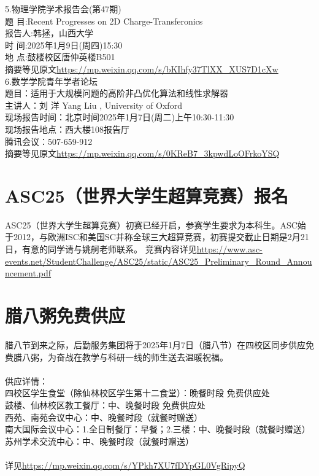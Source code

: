 \documentclass[letterpaper, 12pt]{article}
\begin{document}
\begin{multicols}{2}
5.物理学院学术报告会(第47期)\\
题 目:Recent Progresses on 2D Charge-Transferonics\\
报告人:韩拯，山西大学\\
时 间:2025年1月9日(周四)15:30\\
地 点:鼓楼校区唐仲英楼B501\\
摘要等见原文\url{https://mp.weixin.qq.com/s/bKIhfy37TlXX_XUS7D1cXw}\\

6.数学学院青年学者论坛\\
题目：适用于大规模问题的高阶非凸优化算法和线性求解器\\
主讲人：刘 洋 Yang Liu , University of Oxford\\
现场报告时间：北京时间2025年1月7日(周二)上午10:30-11:30\\
现场报告地点：西大楼108报告厅\\
腾讯会议：507-659-912\\
摘要等见原文\url{https://mp.weixin.qq.com/s/0KReB7_3kpwdLoOFrkoYSQ}\\


\section{ASC25（世界大学生超算竞赛）报名}
ASC25（世界大学生超算竞赛）初赛已经开启，参赛学生要求为本科生。ASC始于2012，与欧洲ISC和美国SC并称全球三大超算竞赛，初赛提交截止日期是2月21日，有意的同学请与姚舸老师联系。
竞赛内容详见\url{https://www.asc-events.net/StudentChallenge/ASC25/static/ASC25_Preliminary_Round_Announcement.pdf}


\section{腊八粥免费供应}
腊八节到来之际，后勤服务集团将于2025年1月7日（腊八节）在四校区同步供应免费腊八粥，为奋战在教学与科研一线的师生送去温暖祝福。\\\\
供应详情：\\
四校区学生食堂（除仙林校区学生第十二食堂）：晚餐时段  免费供应处 \\
鼓楼、仙林校区教工餐厅：中、晚餐时段  免费供应处\\
西苑、南苑会议中心：中、晚餐时段（就餐时赠送）\\
南大国际会议中心：1.全日制餐厅：早餐；2.三楼：中、晚餐时段（就餐时赠送）\\
苏州学术交流中心：中、晚餐时段（就餐时赠送）\\\\
详见\url{https://mp.weixin.qq.com/s/YPkh7XU7fDYpGL0VgRipyQ}




\end{multicols}
\end{document}
